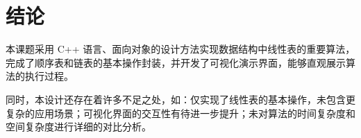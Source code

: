 \chapter{结论}

本课题采用 C++ 语言、面向对象的设计方法实现数据结构中线性表的重要算法，完成了顺序表和链表的基本操作封装，并开发了可视化演示界面，能够直观展示算法的执行过程。

同时，本设计还存在着许多不足之处，如：仅实现了线性表的基本操作，未包含更复杂的应用场景；可视化界面的交互性有待进一步提升；未对算法的时间复杂度和空间复杂度进行详细的对比分析。
